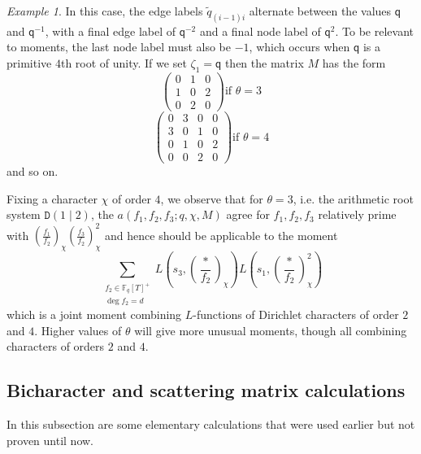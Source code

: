 \documentclass[11pt,letterpaper]{article}
\theoremstyle{definition}
\theoremstyle{remark}
\newtheorem{example}[theorem]{Example}
\numberwithin{equation}{section}
\theoremstyle{dotless}
\newcommand{\gene}{\zeta_1} %
\newcommand{\qq}{\mathbf{ \mathsf{q}}} %
\renewcommand{\tilde}{\widetilde}
\newcommand{\blue}[1]{{\color{blue}{#1}}}
\begin{document}
\begin{example}
In this case, the edge labels $\tilde{q}_{(i-1) i}$ alternate between the values $\qq$ and $\qq^{-1}$, with a final edge label of $\qq^{-2}$ and a final node label of $\qq^2$. To be relevant to moments, the last node label must also be $-1$, which occurs when $\qq$ is a primitive $4$th root of unity. If we set $\gene=\qq$ then the matrix $M$ has the form \[ \begin{pmatrix} 0 & 1 & 0 \\ 1 & 0 & 2 \\ 0 & 2 & 0 \end{pmatrix} \textrm{if } \theta=3\]\[ \begin{pmatrix} 0 & 3 & 0 & 0  \\ 3 & 0 & 1 & 0  \\ 0 & 1 & 0 &  2 \\ 0 & 0 & 2 & 0 \end{pmatrix} \textrm{if } \theta=4\]
and so on.

Fixing a character $\chi$ of order $4$, we observe that for $\theta =3$, i.e. the arithmetic root system $\mathtt D(1 \mid 2)$, the $a(f_1,f_2,f_3;q,\chi, M)$ agree for $f_1,f_2,f_3$ relatively prime with $\left( \frac{f_1}{f_2} \right)_{\chi} \left( \frac{f_3}{f_2} \right)_{\chi}^2$ and hence should be applicable to the moment \[\sum_{\substack { f_2 \in \mathbb F_q[T]^+\\ \deg f_2 =d}} L\left(s_3, \left( \frac{*}{f_2} \right)_{\chi} \right) L\left(s_1, \left( \frac{*}{f_2} \right)_{\chi}^2 \right)  \] which is a joint moment combining $L$-functions of Dirichlet characters of order $2$ and $4$. Higher values of $\theta$ will give more unusual moments, though all combining characters of orders $2$ and $4$.
\end{example}

\subsection{Bicharacter and scattering matrix calculations}

In this subsection are some elementary calculations that were used earlier but not proven until now.
\end{document}
